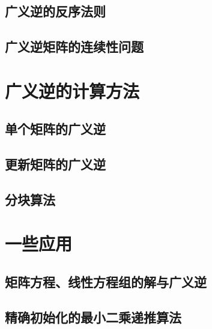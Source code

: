 \begin{definition}
\end{definition}

\subsection{广义逆的反序法则}
\label{sub:广义逆的反序法则}

\subsection{广义逆矩阵的连续性问题}
\label{sub:广义逆矩阵的连续性问题}

\section{广义逆的计算方法}
\label{sec:广义逆的计算方法}

\subsection{单个矩阵的广义逆}
\label{sub:单个矩阵的广义逆}

\subsection{更新矩阵的广义逆}
\label{sub:更新矩阵的广义逆}

\subsection{分块算法}
\label{sub:分块算法}

\section{一些应用}
\label{sec:一些应用}

\subsection{矩阵方程、线性方程组的解与广义逆}
\label{sub:矩阵方程、线性方程组的解与广义逆}

\subsection{精确初始化的最小二乘递推算法}
\label{sub:精确初始化的最小二乘递推算法}


